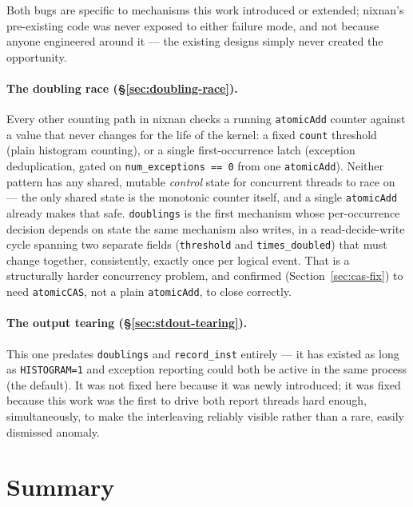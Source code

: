 \documentclass[11pt]{article}
\begin{document}
Both bugs are specific to mechanisms this work introduced or extended; nixnan's
pre-existing code was never exposed to either failure mode, and not because anyone
engineered around it --- the existing designs simply never created the opportunity.

\paragraph{The doubling race (\S\ref{sec:doubling-race}).} Every other counting path in
nixnan checks a running \texttt{atomicAdd} counter against a value that never changes for
the life of the kernel: a fixed \texttt{count} threshold (plain histogram counting), or a
single first-occurrence latch (exception deduplication, gated on
\texttt{num\_exceptions == 0} from one \texttt{atomicAdd}). Neither pattern has any
shared, mutable \emph{control} state for concurrent threads to race on --- the only
shared state is the monotonic counter itself, and a single \texttt{atomicAdd} already
makes that safe. \texttt{doublings} is the first mechanism whose per-occurrence decision
depends on state the same mechanism also writes, in a read-decide-write cycle spanning
two separate fields (\texttt{threshold} and \texttt{times\_doubled}) that must change
together, consistently, exactly once per logical event. That is a structurally harder
concurrency problem, and confirmed (Section~\ref{sec:cas-fix}) to need \texttt{atomicCAS},
not a plain \texttt{atomicAdd}, to close correctly.

\paragraph{The output tearing (\S\ref{sec:stdout-tearing}).} This one predates
\texttt{doublings} and \texttt{record\_inst} entirely --- it has existed as long as
\texttt{HISTOGRAM=1} and exception reporting could both be active in the same process
(the default). It was not fixed here because it was newly introduced; it was fixed
because this work was the first to drive both report threads hard enough,
simultaneously, to make the interleaving reliably visible rather than a rare, easily
dismissed anomaly.

\section{Summary}
\end{document}
